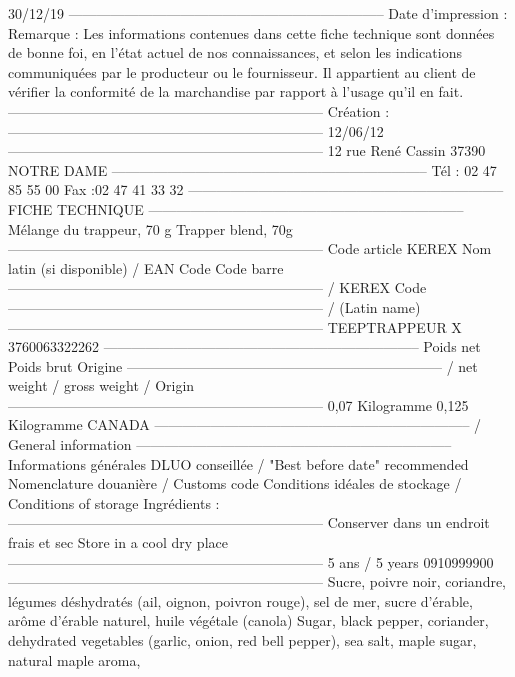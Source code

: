 30/12/19
--------------------------------------------------------------------
Date d'impression : 
Remarque : 
Les informations contenues dans cette fiche technique sont données de bonne foi, en l’état actuel de nos connaissances, et selon 
les indications communiquées par le producteur ou le fournisseur. Il appartient au client de vérifier la conformité de la marchandise 
par rapport à l’usage qu’il en fait.
--------------------------------------------------------------------
Création : 
--------------------------------------------------------------------
12/06/12
--------------------------------------------------------------------
12 rue René Cassin
37390 NOTRE DAME
--------------------------------------------------------------------
Tél :
02 47 85 55 00
Fax :02 47 41 33 32
--------------------------------------------------------------------
FICHE TECHNIQUE
--------------------------------------------------------------------
Mélange du trappeur, 70 g
Trapper blend, 70g
--------------------------------------------------------------------
Code article KEREX
Nom latin (si disponible)
/ EAN Code
Code barre 
--------------------------------------------------------------------
/ KEREX Code
--------------------------------------------------------------------
/ (Latin name)
--------------------------------------------------------------------
TEEPTRAPPEUR
X
3760063322262
--------------------------------------------------------------------
Poids net
Poids brut
Origine 
--------------------------------------------------------------------
/ net weight
/ gross weight
/ Origin
--------------------------------------------------------------------
0,07 Kilogramme
0,125 Kilogramme
CANADA
--------------------------------------------------------------------
/ General information
--------------------------------------------------------------------
Informations générales
DLUO conseillée / "Best before date" recommended
Nomenclature douanière / Customs code
Conditions idéales de stockage 
/ Conditions of storage
Ingrédients : 
--------------------------------------------------------------------
Conserver dans un endroit frais et sec
Store in a cool dry place
--------------------------------------------------------------------
5 ans / 5 years
0910999900
--------------------------------------------------------------------
Sucre, poivre noir, coriandre, légumes déshydratés (ail, oignon,
poivron rouge), sel de mer, sucre d'érable, arôme d'érable naturel,
huile végétale (canola)
Sugar, black pepper, coriander, dehydrated vegetables (garlic, onion,
red bell pepper), sea salt, maple sugar, natural maple aroma,
